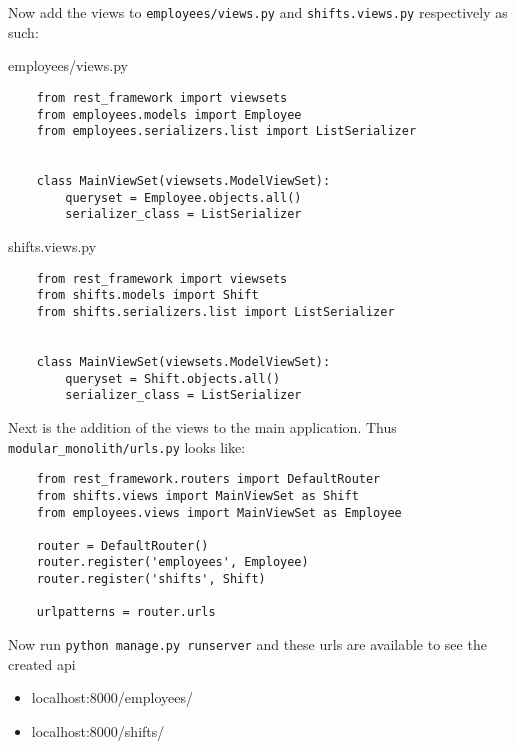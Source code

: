 Now add the views to \texttt{employees/views.py} and \texttt{shifts.views.py} respectively as such:

employees/views.py
\begin{verbatim}
    from rest_framework import viewsets
    from employees.models import Employee
    from employees.serializers.list import ListSerializer


    class MainViewSet(viewsets.ModelViewSet):
        queryset = Employee.objects.all()
        serializer_class = ListSerializer
\end{verbatim}

shifts.views.py
\begin{verbatim}
    from rest_framework import viewsets
    from shifts.models import Shift
    from shifts.serializers.list import ListSerializer


    class MainViewSet(viewsets.ModelViewSet):
        queryset = Shift.objects.all()
        serializer_class = ListSerializer
\end{verbatim}

Next is the addition of the views to the main application. Thus \texttt{modular\_monolith/urls.py} looks like:
\begin{verbatim}
    from rest_framework.routers import DefaultRouter
    from shifts.views import MainViewSet as Shift
    from employees.views import MainViewSet as Employee

    router = DefaultRouter()
    router.register('employees', Employee)
    router.register('shifts', Shift)

    urlpatterns = router.urls
\end{verbatim}

Now run \texttt{python manage.py runserver} and these urls are available to see the created api
\begin{itemize}
  \item localhost:8000/employees/
  \item localhost:8000/shifts/
\end{itemize}
